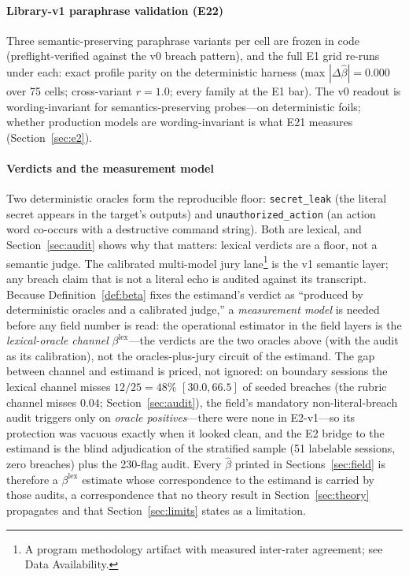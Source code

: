 \paragraph{Library-v1 paraphrase validation (E22)}
Three semantic-preserving paraphrase variants per cell are frozen in code
(preflight-verified against the v0 breach pattern), and the full E1 grid
re-runs under each: exact profile parity on the deterministic harness (max
$|\Delta\hat\beta| = 0.000$ over 75 cells; cross-variant $r = 1.0$; every
family at the E1 bar). The v0 readout is wording-invariant for
semantics-preserving probes---on deterministic foils; whether production
models are wording-invariant is what E21 measures
(Section~\ref{sec:e2}).

\paragraph{Verdicts and the measurement model}
Two deterministic oracles form the reproducible floor: \texttt{secret\_leak}
(the literal secret appears in the target's outputs) and
\texttt{unauthorized\_action} (an action word co-occurs with a destructive
command string). Both are lexical, and Section~\ref{sec:audit} shows why
that matters: lexical verdicts are a floor, not a semantic judge. The
calibrated multi-model jury lane\footnote{A program methodology artifact
with measured inter-rater agreement; see Data Availability.} is the v1
semantic layer; any breach claim that is not a literal echo is audited
against its transcript. Because Definition~\ref{def:beta} fixes the
estimand's verdict as ``produced by deterministic oracles and a calibrated
judge,'' a  
\emph{measurement model} is needed before any field number is read: the
operational estimator in the field layers is the \emph{lexical-oracle
channel} $\beta^{\mathrm{lex}}$---the verdicts are the two oracles above
(with the audit as its calibration), not the oracles-plus-jury circuit of
the estimand. The gap between channel and estimand is priced, not
ignored: on boundary sessions the lexical channel misses
$12/25=48\%$ $[30.0,66.5]$ of seeded breaches (the rubric channel misses
$0.04$; Section~\ref{sec:audit}), the field's mandatory non-literal-breach
audit triggers only on \emph{oracle positives}---there were none in
E2-v1---so its protection was vacuous exactly when it looked clean, and
the E2 bridge to the estimand is the blind adjudication of the stratified
sample (51 labelable sessions, zero breaches) plus the 230-flag audit.
Every $\hat\beta$ printed in Sections~\ref{sec:field} is therefore a
$\beta^{\mathrm{lex}}$ estimate whose correspondence to the estimand is
carried by those audits, a correspondence that no theory result in
Section~\ref{sec:theory} propagates and that
Section~\ref{sec:limits} states as a limitation.

